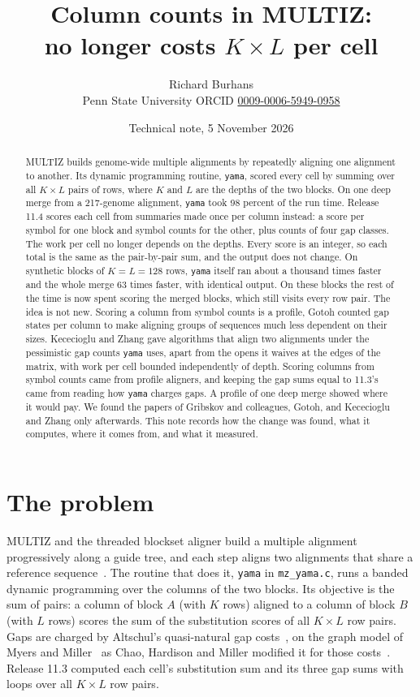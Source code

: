 \documentclass[11pt,letterpaper]{article}
\title{\textbf{Column counts in MULTIZ:\\\code{yama} no longer costs $K \times L$ per cell}}
\author{Richard Burhans\\\small Penn State University \quad ORCID \href{https://orcid.org/0009-0006-5949-0958}{0009-0006-5949-0958}}
\date{Technical note, 5 November 2026}
\newcommand{\code}[1]{\texttt{#1}}
\begin{document}
\maketitle

\begin{abstract}
\noindent MULTIZ builds genome-wide multiple alignments by repeatedly aligning one alignment to another. Its dynamic
programming routine, \code{yama}, scored every cell by summing over all $K \times L$ pairs of rows, where $K$ and $L$
are the depths of the two blocks. On one deep merge from a 217-genome alignment, \code{yama} took 98 percent of the
run time. Release 11.4 scores each cell from summaries made once per column instead: a score per symbol for one block
and symbol counts for the other, plus counts of four gap classes. The work per cell no longer depends on the depths.
Every score is an integer, so each total is the same as the pair-by-pair sum, and the output does not change. On
synthetic blocks of $K = L = 128$ rows, \code{yama} itself ran about a thousand times faster and the whole merge 63
times faster, with identical output. On these blocks the rest of the time is now spent scoring the merged blocks,
which still visits every row pair. The idea is not new. Scoring a column from symbol counts is a profile, Gotoh
counted gap states per column to make aligning groups of sequences much less dependent on their sizes. Kececioglu
and Zhang gave algorithms that align two alignments under the pessimistic gap counts \code{yama} uses, apart from the
opens it waives at the edges of the matrix, with work per cell bounded independently of depth. Scoring columns from symbol counts came from profile aligners, and keeping the gap sums equal to 11.3's came from reading how \code{yama} charges gaps. A profile of one deep merge showed where it would pay. We found the papers of Gribskov and colleagues, Gotoh, and Kececioglu and Zhang only afterwards. This note records how the change was found,
what it computes, where it comes from, and what it measured.
\end{abstract}

\section{The problem}

MULTIZ and the threaded blockset aligner build a multiple alignment progressively along a guide tree, and each step
aligns two alignments that share a reference sequence~\cite{blanchette2004}. The routine that does it, \code{yama}
in \code{mz\_yama.c}, runs a banded dynamic programming over the columns of the two blocks. Its objective is the sum
of pairs: a column of block $A$ (with $K$ rows) aligned to a column of block $B$ (with $L$ rows) scores the sum of the
substitution scores of all $K \times L$ row pairs. Gaps are charged by Altschul's quasi-natural gap costs~\cite{altschul1989}, on the
graph model of Myers and Miller~\cite{myers1989} as Chao, Hardison and Miller modified it for those costs~\cite{chao1994}. Release 11.3 computed each cell's substitution
sum and its three gap sums with loops over all $K \times L$ row pairs.
\end{document}
